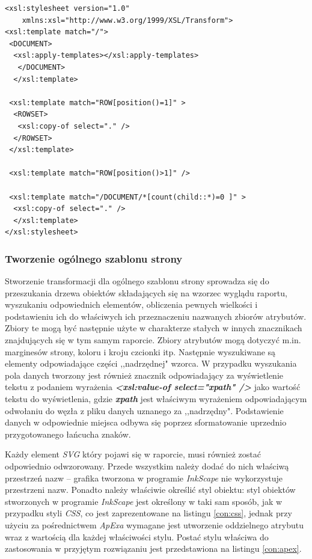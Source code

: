 \documentclass[11pt,a4paper]{article}
\begin{document}
\lstset{language=XSLT}
\begin{lstlisting}[frame=single,caption=Transformacja wstępnie przetwarzająca dane, label=solution:tool:xslt]
<xsl:stylesheet version="1.0" 
    xmlns:xsl="http://www.w3.org/1999/XSL/Transform">
<xsl:template match="/">
 <DOCUMENT>
  <xsl:apply-templates></xsl:apply-templates>
   </DOCUMENT>
  </xsl:template>

 <xsl:template match="ROW[position()=1]" >
  <ROWSET>
   <xsl:copy-of select="." />
  </ROWSET>
 </xsl:template>

 <xsl:template match="ROW[position()>1]" />

 <xsl:template match="/DOCUMENT/*[count(child::*)=0 ]" >
  <xsl:copy-of select="." />
  </xsl:template>
</xsl:stylesheet>
\end{lstlisting}


\subsubsection{Tworzenie ogólnego szablonu strony}
Stworzenie transformacji dla ogólnego szablonu strony sprowadza się do przeszukania drzewa obiektów składających się na wzorzec wyglądu raportu, wyszukaniu odpowiednich elementów, obliczenia pewnych wielkości i podstawieniu ich do właściwych ich przeznaczeniu nazwanych zbiorów atrybutów. Zbiory te mogą być następnie użyte w charakterze stałych w innych znacznikach znajdujących się w tym samym raporcie. Zbiory atrybutów mogą dotyczyć m.in. marginesów strony, koloru i kroju czcionki itp. Następnie wyszukiwane są elementy odpowiadające części ,,nadrzędnej" wzorca. W przypadku wyszukania pola danych tworzony jest również znacznik odpowiadający za wyświetlenie tekstu z podaniem wyrażenia \textbf{\emph{\textless xsl:value-of select="xpath" /\textgreater}} jako wartość tekstu do wyświetlenia, gdzie \textbf{\emph{xpath}} jest właściwym wyrażeniem odpowiadającym odwołaniu do węzła z pliku danych uznanego za ,,nadrzędny". Podstawienie danych w odpowiednie miejsca odbywa się poprzez sformatowanie uprzednio przygotowanego łańcucha znaków.

Każdy element \emph{SVG} który pojawi się w raporcie, musi również zostać odpowiednio odwzorowany. Przede wszystkim należy dodać do nich właściwą przestrzeń nazw -- grafika tworzona w programie \emph{InkScape} nie wykorzystuje przestrzeni nazw. Ponadto należy właściwie określić styl obiektu: styl obiektów stworzonych w programie \emph{InkScape} jest określony w taki sam sposób, jak w przypadku styli \emph{CSS}, co jest zaprezentowane na listingu \ref{con:css}, jednak przy użyciu za pośrednictwem \emph{ApExa} wymagane jest utworzenie oddzielnego atrybutu wraz z wartością dla każdej właściwości stylu. Postać stylu właściwa do zastosowania w przyjętym rozwiązaniu jest przedstawiona na listingu \ref{con:apex}.
\end{document}
